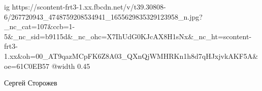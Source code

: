  
 
 
 
 

\ifcmt
  ig https://scontent-frt3-1.xx.fbcdn.net/v/t39.30808-6/267720943_4748759208534941_1655629835329123958_n.jpg?_nc_cat=107&ccb=1-5&_nc_sid=b9115d&_nc_ohc=X7IhUdG0KJcAX8H1sNx&_nc_ht=scontent-frt3-1.xx&oh=00_AT9qazMCpFK6Z8A03_QXnQjWMHRKn1h8d7qHJxjvkAKF5A&oe=61C0EB57
  @width 0.45
\fi

Сергей Сторожев
